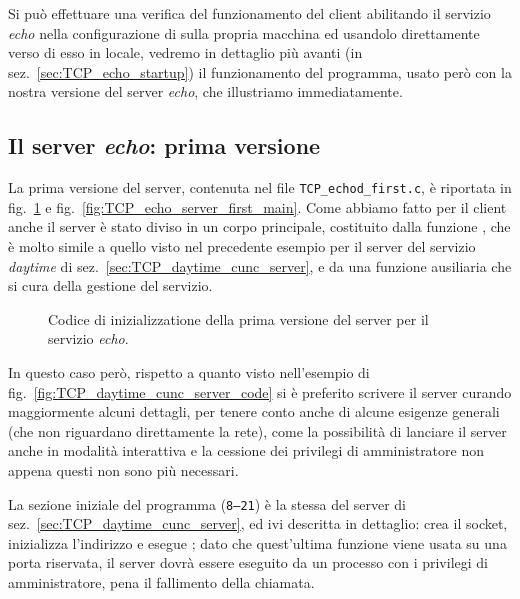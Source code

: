 Si può effettuare una verifica del funzionamento del client abilitando il
servizio \textit{echo} nella configurazione di  sulla propria
macchina ed usandolo direttamente verso di esso in locale, vedremo in
dettaglio più avanti (in sez.~\ref{sec:TCP_echo_startup}) il funzionamento del
programma, usato però con la nostra versione del server \textit{echo}, che
illustriamo immediatamente.


\subsection{Il server \textit{echo}: prima versione}
\label{sec:TCPsimp_server_main}

La prima versione del server, contenuta nel file \texttt{TCP\_echod\_first.c},
è riportata in fig.~\ref{fig:TCP_echo_server_first_code} e
fig.~\ref{fig:TCP_echo_server_first_main}. Come abbiamo fatto per il client
anche il server è stato diviso in un corpo principale, costituito dalla
funzione , che è molto simile a quello visto nel precedente esempio
per il server del servizio \textit{daytime} di
sez.~\ref{sec:TCP_daytime_cunc_server}, e da una funzione ausiliaria
 che si cura della gestione del servizio.

\begin{figure}[!htb]
  \footnotesize \centering
  \begin{minipage}[c]{\codesamplewidth}
  \end{minipage} 
  \normalsize
  \caption{Codice di inizializzatione della prima versione del server
    per il servizio \textit{echo}.}
  \label{fig:TCP_echo_server_first_code}
\end{figure}

In questo caso però, rispetto a quanto visto nell'esempio di
fig.~\ref{fig:TCP_daytime_cunc_server_code} si è preferito scrivere il server
curando maggiormente alcuni dettagli, per tenere conto anche di alcune
esigenze generali (che non riguardano direttamente la rete), come la
possibilità di lanciare il server anche in modalità interattiva e la cessione
dei privilegi di amministratore non appena questi non sono più necessari.

La sezione iniziale del programma (\texttt{\small 8--21}) è la stessa del
server di sez.~\ref{sec:TCP_daytime_cunc_server}, ed ivi descritta in
dettaglio: crea il socket, inizializza l'indirizzo e esegue ; dato
che quest'ultima funzione viene usata su una porta riservata, il server dovrà
essere eseguito da un processo con i privilegi di amministratore, pena il
fallimento della chiamata.

